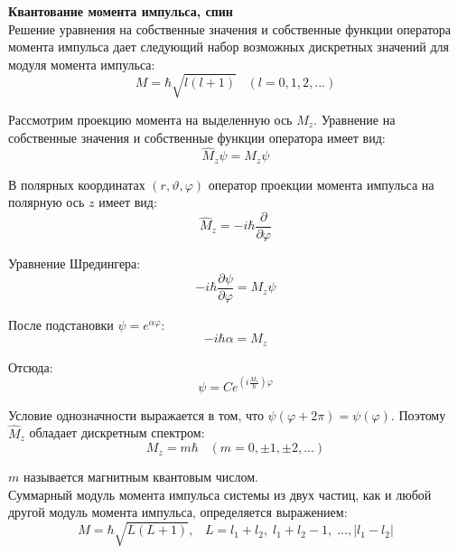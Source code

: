 \documentclass{article}
\begin{document}
	\textbf{Квантование момента импульса, спин}\\

	Решение уравнения на собственные значения и собственные функции оператора момента импульса дает следующий набор возможных дискретных значений для модуля момента импульса:
	\begin{equation}
		M = \hbar\sqrt{l(l+1)}\;\;\;(l=0,1,2,...)
	\end{equation}

	Рассмотрим проекцию момента на выделенную ось $M_z$. Уравнение на собственные значения и собственные функции оператора имеет вид:
	\begin{equation}
		\hat M_z\psi = M_z\psi
	\end{equation}

	В полярных координатах $(r,\vartheta,\varphi)$ оператор проекции момента импульса на полярную ось $z$ имеет вид:
	\begin{equation}
		\hat M_z = -i\hbar\frac{\partial}{\partial\varphi}
	\end{equation}

	Уравнение Шредингера:
	\begin{equation}
		-i\hbar\frac{\partial\psi}{\partial\varphi} = M_z\psi
	\end{equation}

	После подстановки $\psi = e^{\alpha\varphi}$:
	\begin{equation}
		-i\hbar\alpha = M_z
	\end{equation}

	Отсюда:
	\begin{equation}
		\psi = Ce^{(i\frac{M_z}{\hbar})\varphi}
	\end{equation}

	Условие однозначности выражается в том, что $\psi(\varphi+2\pi)=\psi(\varphi)$. Поэтому $\hat M_z$ обладает дискретным спектром:
	\begin{equation}
		M_z = m\hbar\;\;\;(m=0,\pm 1,\pm 2,...)
	\end{equation}

	$m$ называется магнитным квантовым числом.\\

	Суммарный модуль момента импульса системы из двух частиц, как и любой другой модуль момента импульса, определяется выражением:
	\begin{equation}
		M = \hbar\sqrt{L(L+1)},\;\;\;L=l_1+l_2,\;l_1+l_2-1,\;...,|l_1-l_2|
	\end{equation}
\end{document}
